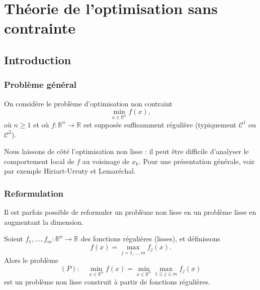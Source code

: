 
\chapter{Théorie de l’optimisation sans contrainte}
\label{chap:unconstrained}

\section{Introduction}
\label{sec:2.1}

\subsection{Problème général}
\label{subsec:2.1.1}

On considère le problème d’optimisation non contraint
\begin{equation}
    \min_{x \in \mathbb{R}^n} f(x),
\end{equation}
où $n \geq 1$ et où $f : \mathbb{R}^n \to \mathbb{R}$ est supposée suffisamment régulière
(typiquement $\mathcal{C}^1$ ou $\mathcal{C}^2$).

\begin{remarque}
Nous laissons de côté l’optimisation non lisse : il peut être difficile d’analyser le
comportement local de $f$ au voisinage de $x_k$. Pour une présentation générale,
voir par exemple Hiriart-Urruty et Lemaréchal.
\end{remarque}

\subsection{Reformulation}
\label{subsec:2.1.2}

Il est parfois possible de reformuler un problème non lisse en un problème lisse
en augmentant la dimension.

Soient $f_1,\dots,f_m : \mathbb{R}^n \to \mathbb{R}$ des fonctions régulières (lisses), et définissons
\begin{equation}
    f(x) = \max_{j=1,\dots,m} f_j(x).
\end{equation}
Alors le problème
\begin{equation}
    (P) :\quad \min_{x \in \mathbb{R}^n} f(x)
        = \min_{x \in \mathbb{R}^n} \max_{1 \le j \le m} f_j(x)
\end{equation}
est un problème non lisse construit à partir de fonctions régulières.

